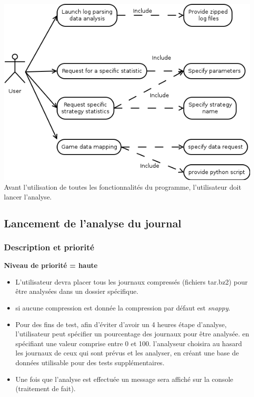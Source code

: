 \documentclass{scrreprt}
\begin{document}
\includegraphics[scale=0.45,keepaspectratio]{UseCaseParsing}\\
Avant l'utilisation de toutes les fonctionnalités du programme, l'utilisateur doit lancer l'analyse.
\subsection{Lancement de l'analyse du journal}
\subsubsection{Description et priorité}
\textbf{Niveau de priorité = haute}\\
\begin{itemize}
  \item L'utilisateur devra placer tous les journaux compressés (fichiers tar.bz2) pour être analysées dans un dossier spécifique.
  \item si aucune compression est donnée la compression par défaut est \textit{snappy}.
    \item Pour des fins de test, afin d'éviter d'avoir un 4 heures étape d'analyse, l'utilisateur peut spécifier un pourcentage des journaux pour être analysée. en spécifiant une valeur comprise entre 0 et 100. l'analyseur choisira au hasard les journaux de ceux qui sont prévus et les analyser, en créant une base de données utilisable pour des tests supplémentaires.
    \item Une fois que l'analyse est effectuée un message sera affiché sur la console (traitement de fait).

\end{itemize}
\end{document}
